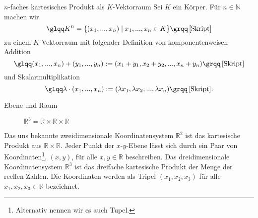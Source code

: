 \theoremstyle{example}
\begin{example}{$n$-faches kartesisches Produkt als $K$-Vektorraum}
Sei $K$ ein Körper. Für $n \in \mathbb{N}$ machen wir \[\text{{\glqq}} K^n = \{(x_1,...,x_n) \mid x_1,...,x_n \in K\} \text{{\grqq}} \, \text{\cite[S. 28, 6.2]{Skript}}\]zu einem $K$-Vektorraum mit folgender Definition von komponentenweisen Addition
\[\text{{\glqq}}(x_1,...,x_n)+(y_1,...,y_n) := (x_1 + y_1,x_2 + y_2,..., x_n + y_n)\text{{\grqq}}\, \text{\cite[S. 28, 6.2]{Skript}}\]
und Skalarmultiplikation
\[\text{{\glqq}}\lambda \cdot (x_1,...,x_n):= (\lambda x_1,\lambda x_2,...,\lambda x_n)\text{{\grqq}} \, \text{\cite[S. 28, 6.2]{Skript}.}\]
\end{example}

\theoremstyle{example}
\begin{example}{Ebene und Raum} \label{KoS}
\begin{figure}[h]
\begin{minipage}[t]{.5\textwidth}
\captionsetup{singlelinecheck=off}
\caption{$\mathbb{R}^2=\mathbb{R} \times \mathbb{R}$}
\end{minipage}
\hfill
\begin{minipage}[t]{.45\textwidth}
\caption{$\mathbb{R}^3=\mathbb{R} \times \mathbb{R} \times \mathbb{R}$}
\end{minipage}
\end{figure}
Das uns bekannte zweidimensionale Koordinatensystem $\mathbb{R}^2$ ist das kartesische Produkt aus \(\mathbb{R} \times \mathbb{R}\). Jeder Punkt der $x$-$y$-Ebene lässt sich durch ein {\glqq}Paar von Koordinaten\footnote{Alternativ nennen wir es auch Tupel.}, $(x, y)$,{\grqq} \cite[S. 28]{Enzy} für alle ${x, y\in \mathbb{R}}$ beschreiben. Das dreidimensionale Koordinatensystem $\mathbb{R}^3$ ist das dreifache kartesische Produkt der Menge der reellen Zahlen. Die Koordinaten werden als {\glqq}Tripel{\grqq}  \cite[S. 28]{Enzy} $(x_1, x_2, x_3)$ für alle $x_1, x_2, x_3\in \mathbb{R}$ bezeichnet.
\end{example}


